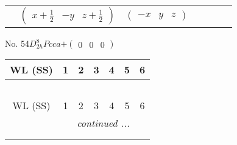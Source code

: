 \documentclass[fleqn,9pt,landscape]{jsarticle}
\begin{document}
\begin{center}
\begin{longtable}{ccccccc}
& $ \begin{pmatrix} x + \frac{1}{2} & - y & z + \frac{1}{2} \end{pmatrix} $ & $ \begin{pmatrix} - x & y & z \end{pmatrix} $ & $  $ & $  $ & $  $ & $  $ \\
\end{longtable}
\end{center}
\newpage
No. 54\quad$D_{2h}^{8}$\quad$Pcca$\quad[ orthorhombic ]\quad$+\begin{pmatrix} 0 & 0 & 0 \end{pmatrix}$
\begin{center}
\renewcommand{\arraystretch}{1.2}
\begin{longtable}{ccccccc}
 \hline \hline
WL (SS) & 1 & 2 & 3 & 4 & 5 & 6 \\ \hline \endfirsthead

\multicolumn{6}{l}{\tablename\ \thetable{}} \\
 \hline \hline
WL (SS) & 1 & 2 & 3 & 4 & 5 & 6 \\ \hline \endhead

 \hline \hline
\multicolumn{6}{r}{\footnotesize\it continued ...} \\ \endfoot

 \hline \hline
\multicolumn{6}{r}{} \\ \endlastfoot


\end{longtable}
\end{center}
\end{document}

